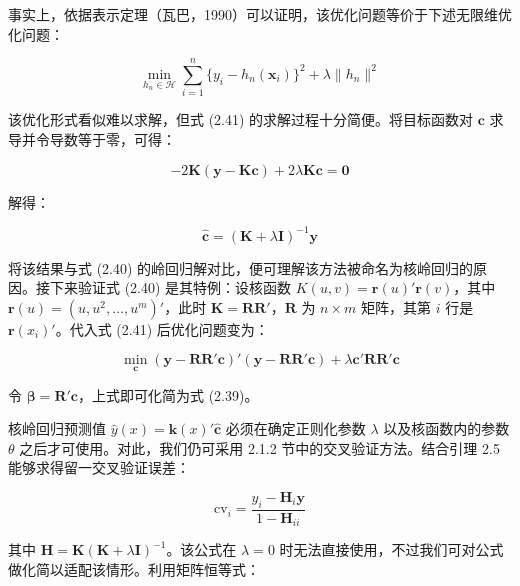 \documentclass{ctexart}
\begin{document}
事实上，依据表示定理（瓦巴，1990）可以证明，该优化问题等价于下述无限维优化问题：

\begin{equation*}
\min_{h_n\in\mathcal{H}}\sum_{i=1}^n\big\{y_i- h_n(\boldsymbol{x}_i)\big\}^2+\lambda\|h_n\|^2
\end{equation*}

该优化形式看似难以求解，但式 (2.41) 的求解过程十分简便。将目标函数对 $\boldsymbol{c}$ 求导并令导数等于零，可得：

\begin{equation*}
-2\boldsymbol{K}(\boldsymbol{y}-\boldsymbol{K}\boldsymbol{c})+2\lambda\boldsymbol{K}\boldsymbol{c}=\boldsymbol{0}
\end{equation*}

解得：

\begin{equation*}
\widehat{\boldsymbol{c}}=(\boldsymbol{K}+\lambda\boldsymbol{I})^{-1}\boldsymbol{y}
\tag{2.42}
\end{equation*}

将该结果与式 (2.40) 的岭回归解对比，便可理解该方法被命名为核岭回归的原因。接下来验证式 (2.40) 是其特例：设核函数 $K(u,v)=\boldsymbol{r}(u)'\boldsymbol{r}(v)$，其中 $\boldsymbol{r}(u)=(u,u^2,\dots,u^m)'$，此时 $\boldsymbol{K}=\boldsymbol{R}\boldsymbol{R}'$，$\boldsymbol{R}$ 为 $n\times m$ 矩阵，其第 $i$ 行是 $\boldsymbol{r}(x_i)'$。代入式 (2.41) 后优化问题变为：

\begin{equation*}
\min_{\boldsymbol{c}}(\boldsymbol{y}-\boldsymbol{R}\boldsymbol{R}'\boldsymbol{c})'(\boldsymbol{y}-\boldsymbol{R}\boldsymbol{R}'\boldsymbol{c})+\lambda\boldsymbol{c}'\boldsymbol{R}\boldsymbol{R}'\boldsymbol{c}
\end{equation*}

令 $\boldsymbol{\beta}=\boldsymbol{R}'\boldsymbol{c}$，上式即可化简为式 (2.39)。

核岭回归预测值 $\widehat{y}(x)=\boldsymbol{k}(x)'\widehat{\boldsymbol{c}}$ 必须在确定正则化参数 $\lambda$ 以及核函数内的参数 $\theta$ 之后才可使用。对此，我们仍可采用 2.1.2 节中的交叉验证方法。结合引理 2.5 能够求得留一交叉验证误差：

\begin{equation*}
\mathrm{cv}_i=\frac{y_i-\boldsymbol{H}_i\boldsymbol{y}}{1-\boldsymbol{H}_{ii}}
\end{equation*}

其中 $\boldsymbol{H}=\boldsymbol{K}(\boldsymbol{K}+\lambda\boldsymbol{I})^{-1}$。该公式在 $\lambda=0$ 时无法直接使用，不过我们可对公式做化简以适配该情形。利用矩阵恒等式：
\end{document}
